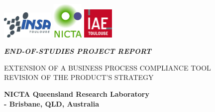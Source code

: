 \documentclass[10pt]{report}
\begin{document}
\setlength{\parindent}{1em}
\def\labelitemi{--} %

\begin{titlepage}

\begin{center}

\includegraphics[width=2.5cm]{INSA-logo.jpg} \hspace{3cm}
\includegraphics[width=1.5cm]{NICTA-logo.jpg}\hspace{4cm}
\includegraphics[width=1.5cm]{IAE-logo.jpg} 

\vspace{3cm}
\textsc{\LARGE \textit{\textbf{\uppercase{End-of-studies project report}}}}
\vspace{1.5cm}

\begin{framed}
\LARGE \uppercase{Extension of a Business Process Compliance tool\\Revision of the Product's Strategy}
\end{framed}

\vspace{2cm}


\end{center}
\vspace{1.5cm}
\begin{flushright}
\textbf{\large  NICTA Queensland Research Laboratory\\ \hspace{.5cm}- Brisbane, QLD, Australia}
\end{flushright}

\vspace{1.3cm}


\end{titlepage}
\end{document}
